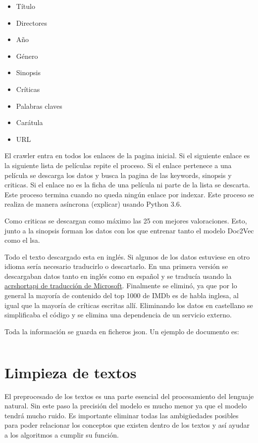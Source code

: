 \documentclass[withindex, glossary]{cam-thesis}
\begin{document}
\setlength{\columnseprule}{0pt}
\begin{multicols}{2}
    \begin{itemize}
        \item Título
        \item Directores
        \item Año
        \item Género
        \item Sinopsis
        \item Críticas
        \item Palabras claves
        \item Carátula
        \item URL
    \end{itemize}
\end{multicols}

El crawler entra en todos los enlaces de la pagina inicial. Si el siguiente enlace es la siguiente lista de películas repite el proceso. Si el enlace pertenece a una película se descarga los datos y busca la pagina de las keywords, sinopsis y criticas. Si el enlace no es la ficha de una película ni parte de la lista se descarta. Este proceso termina cuando no queda ningún enlace por indexar. Este proceso se realiza de manera asíncrona (explicar) usando Python 3.6.

Como criticas se descargan como máximo las 25 con mejores valoraciones. Esto, junto a la sinopsis forman los datos con los que entrenar tanto el modelo Doc2Vec como el \acrshort{lsa}.

Todo el texto descargado esta en inglés. Si algunos de los datos estuviese en otro idioma sería necesario traducirlo o descartarlo. En una primera versión se descargaban datos tanto en inglés como en español y se traducía usando la \href{https://www.microsoft.com/en-us/translator/translatorapi.aspx}{acrshort{api} de traducción de Microsoft}. Finalmente se eliminó, ya que por lo general la mayoría de contenido del top 1000 de IMDb\cite{imdb} es de habla inglesa, al igual que la mayoría de críticas escritas allí. Eliminando los datos en castellano se simplificaba el código y se elimina una dependencia de un servicio externo.

Toda la información se guarda en ficheros \acrshort{json}. Un ejemplo de documento es:

\inputminted[xleftmargin=21pt, breaklines=true, tabsize=2]{json}{figures/example.json}

\chapter{Limpieza de textos}\label{chap:clean}
El preprocesado de los textos es una parte esencial del procesamiento del lenguaje natural. Sin este paso la precisión del modelo es mucho menor ya que el modelo tendrá mucho ruido. Es importante eliminar todas las ambigüedades posibles para poder relacionar los conceptos que existen dentro de los textos y así ayudar a los algoritmos a cumplir su función.
\end{document}
